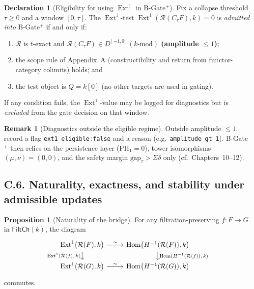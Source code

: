 \documentclass[11pt]{article}
\numberwithin{equation}{section}
\theoremstyle{plain}
\theoremstyle{definition}
\theoremstyle{remark}
\DeclareMathOperator{\Ext}{Ext}
\DeclareMathOperator{\Hom}{Hom}
\theoremstyle{plain}
\theoremstyle{definition}
\numberwithin{equation}{section}
\newtheorem{proposition}[theorem]{Proposition}
\theoremstyle{definition}
\newtheorem{remark}[theorem]{Remark}
\newtheorem{declaration}[theorem]{Declaration}
\numberwithin{equation}{section}
\theoremstyle{plain}
\theoremstyle{definition}
\theoremstyle{remark}
\providecommand{\n}{\unskip\space}
\begin{document}
\begin{declaration}[Eligibility for using \(\Ext^1\) in B-Gate\(^{+}\)]\label{C:decl:eligibility}
Fix a collapse threshold \(\tau\ge 0\) and a window \([0,\tau]\).
The \(\Ext^1\)-test \(\Ext^1(\mathcal{R}(C_\tau F),k)=0\) is \emph{admitted into} B-Gate\(^{+}\) if and only if:
\begin{enumerate}\itemsep0.2em
  \item \(\mathcal{R}\) is \(t\)-exact and \(\mathcal{R}(C_\tau F)\in D^{[-1,0]}(k\text{-mod})\) \textbf{(amplitude \(\le 1\))};
  \item the scope rule of Appendix~A (constructibility and return from functor-category colimits) holds; and
  \item the test object is \(Q=k[0]\) (no other targets are used in gating).
\end{enumerate}
If any condition fails, the \(\Ext^1\)-value may be logged for diagnostics but is \emph{excluded} from the gate decision on that window.
\end{declaration}

\begin{remark}[Diagnostics outside the eligible regime]\label{C:rk:diag}
Outside amplitude \(\le 1\), record a flag \texttt{ext1\_eligible:false} and a reason (e.g.\ \texttt{amplitude\_gt\_1}).
B-Gate\(^{+}\) then relies on the persistence layer (\(\mathrm{PH}_1=0\)), tower isomorphisms \((\mu,\nu)=(0,0)\), and the safety margin \(\mathrm{gap}_\tau>\Sigma\delta\) only (cf.\ Chapters~10–12).
\end{remark}

\subsection*{C.6. Naturality, exactness, and stability under admissible updates}

\begin{proposition}[Naturality of the bridge]\label{C:prop:naturality}
For any filtration-preserving \(f:F\to G\) in \(\mathsf{FiltCh}(k)\), the diagram
\[
\begin{tikzcd}[row sep=1.2em, column sep=2.4em]\n\Ext^1\!\big(\mathcal{R}(F),k\big)\n  \arrow[r, "\sim"]\n  \arrow[d, "{\Ext^1(\mathcal{R}(f),\,k)}"'] &\n\Hom\!\big(H^{-1}(\mathcal{R}(F)),k\big)\n  \arrow[d, "{\Hom(H^{-1}(\mathcal{R}(f)),\,k)}"]\\\n\Ext^1\!\big(\mathcal{R}(G),k\big)\n  \arrow[r, "\sim"] &\n\Hom\!\big(H^{-1}(\mathcal{R}(G)),k\big)\n\end{tikzcd}
\]
commutes.
\end{proposition}
\end{document}
